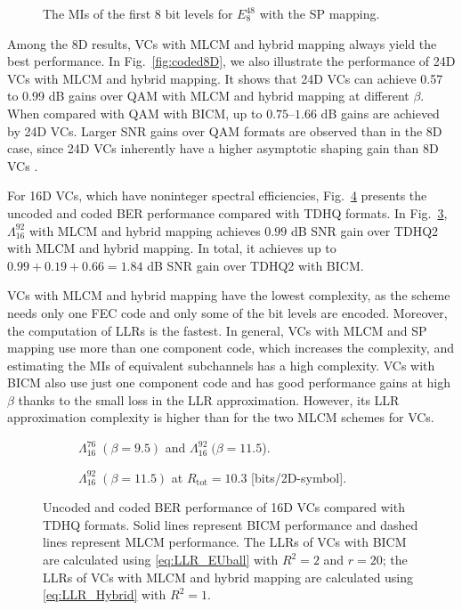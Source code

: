 \documentclass[journal]{IEEEtran}
\begin{document}
\begin{figure}
    \centering
    
    \caption{The MIs of the first 8 bit levels for $E_8^{48}$ with the SP mapping.}
    \label{fig:CMIVC}
\end{figure}
Among the 8D results, VCs with MLCM and hybrid mapping always yield the best performance. In Fig.~\ref{fig:coded8D}, we also illustrate the performance of 24D VCs with MLCM and hybrid mapping. It shows that 24D VCs can achieve 0.57 to 0.99 dB gains over QAM with MLCM and hybrid mapping at different $\beta$. When compared with QAM with BICM, up to $0.75$--$1.66$ dB gains are achieved by 24D VCs. Larger SNR gains over QAM formats are observed than in the 8D case, since 24D VCs inherently have a higher asymptotic shaping gain than 8D VCs \cite[Table I]{ourTC}.

For 16D VCs, which have noninteger spectral efficiencies, Fig.~\ref{fig:16D} presents the uncoded and coded BER performance compared with TDHQ formats. In Fig.~\ref{fig:coded16D}, $\Lambda_{16}^{92}$ with MLCM and hybrid mapping achieves $0.99$ dB SNR gain over TDHQ2 with MLCM and hybrid mapping. In total, it achieves up to $0.99+0.19+0.66=1.84$ dB SNR gain over TDHQ2 with BICM.

VCs with MLCM and hybrid mapping have the lowest complexity, as the scheme needs only one FEC code and only some of the bit levels are encoded. Moreover, the computation of LLRs is the fastest. In general, VCs with MLCM and SP mapping use more than one component code, which increases the complexity, and estimating the MIs of equivalent subchannels has a high complexity. VCs with BICM also use just one component code and has good performance gains at high $\beta$ thanks to the small loss in the LLR approximation. However, its LLR approximation complexity is higher than for the two MLCM schemes for VCs.  







\begin{figure}[tbp]
    \centering
    \begin{subfigure}{0.45\linewidth}
         \centering
         
        \caption{$\Lambda_{16}^{76}\; (\beta=9.5)$ and $\Lambda_{16}^{92}\; (\beta=11.5$).}
        \label{fig:uncoded16D}
    \end{subfigure}
    \begin{subfigure}{0.45\linewidth}
        \centering
        
        \caption{$\Lambda_{16}^{92}\; (\beta=11.5)$ at $R_{\text{tot}}= 10.3$ [bits/2D-symbol].}
        \label{fig:coded16D}
    \end{subfigure}
    \caption{Uncoded and coded BER performance of 16D VCs compared with TDHQ formats. Solid lines represent BICM performance and dashed lines represent MLCM performance. The LLRs of VCs with BICM are calculated using \eqref{eq:LLR_EUball} with $R^2=2$ and $r=20$; the LLRs of VCs with MLCM and hybrid mapping are calculated using \eqref{eq:LLR_Hybrid} with $R^2=1$.}
    \label{fig:16D}
\end{figure}
\end{document}
